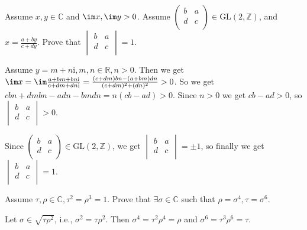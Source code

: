 \documentclass{ctexart}
\newif\ifpreface
\begin{document}
\large
\setlength{\baselineskip}{1.2em}
\ifpreface

\newgeometry{left=2cm,right=2cm,top=2cm,bottom=2cm}
\else
{}
\maketitle
\fi
\begin{problem}
  Assume \(x,y \in \mathbb{C}\) and \(\im x,\im y>0\). Assume \(
    \begin{pmatrix}
      b & a\\
      d & c\\
  \end{pmatrix} \in \text{GL}(2,\mathbb{Z})\), and \(x= \frac{a+by}{c+dy}\).
  Prove that \(
    \begin{vmatrix}
      b & a\\
      d & c\\
  \end{vmatrix}=1\).
\end{problem}
\begin{solution}
  Assume \(y=m+n \mathrm{i},m,n \in \mathbb{R},n>0\).
  Then we get \(\im x = \im \frac{a+bm+bn \mathrm{i}}{c+dm+dn \mathrm{i}}=\frac{(c+dm)bn-(a+bm)dn}{(c+dm)^2+(dn)^2}>0\).
  So we get \(cbn+dmbn-adn-bm dn=n(cb-ad)>0\). Since \(n>0\) we get \(cb-ad>0\), so \(
    \begin{vmatrix}
      b & a\\
      d & c\\
  \end{vmatrix}>0\).

  Since \(
    \begin{pmatrix}
      b & a\\
      d & c\\
  \end{pmatrix}\in \text{GL}(2,\mathbb{Z})\), we get \(
    \begin{vmatrix}
      b & a\\
      d & c\\
  \end{vmatrix}=\pm 1\), so finally we get \(
    \begin{vmatrix}
      b & a\\
      d & c\\
  \end{vmatrix}=1\).
\end{solution}

\begin{problem}
  Assume \(\tau,\rho \in \mathbb{C},\tau^2=\rho^3=1\). Prove that \(\exists \sigma \in \mathbb{C}\) such that \(\rho=\sigma^4,\tau=\sigma^6\).
\end{problem}

\begin{solution}
  Let \(\sigma \in \sqrt{\tau \rho^2}\), i.e., \(\sigma^2=\tau \rho^2\).
  Then \(\sigma^4=\tau^2 \rho^4=\rho\) and \(\sigma^6=\tau^3\rho^6=\tau \).
\end{solution}
\end{document}
